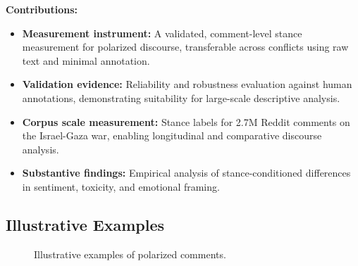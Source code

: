 \documentclass[letterpaper]{article} %
\begin{document}
\vspace{0.5em}
\textbf{Contributions:}
\begin{itemize}
    \item \textbf{Measurement instrument:} A validated, comment-level stance measurement for polarized discourse, transferable across conflicts using raw text and minimal annotation.
    \item \textbf{Validation evidence:} Reliability and robustness evaluation against human annotations, demonstrating suitability for large-scale descriptive analysis.
    \item \textbf{Corpus scale measurement:} Stance labels for 2.7M Reddit comments on the Israel-Gaza war, enabling longitudinal and comparative discourse analysis.
    \item \textbf{Substantive findings:} Empirical analysis of stance-conditioned differences in sentiment, toxicity, and emotional framing.
\end{itemize}


\subsection{Illustrative Examples}

\begin{figure}[h]
\centering


\vspace{0.6em}


\vspace{0.6em}


\caption{Illustrative examples of polarized comments.}
\label{fig:polarized_quotes}
\end{figure}
\end{document}
